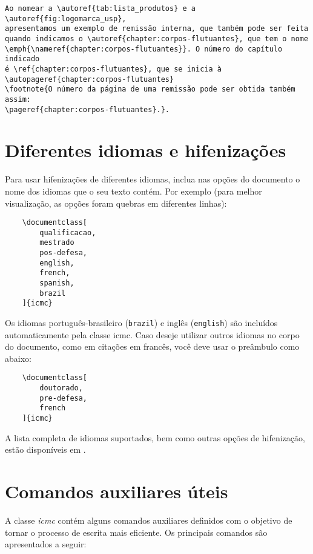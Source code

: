 \begin{verbatim}
Ao nomear a \autoref{tab:lista_produtos} e a \autoref{fig:logomarca_usp}, 
apresentamos um exemplo de remissão interna, que também pode ser feita 
quando indicamos o \autoref{chapter:corpos-flutuantes}, que tem o nome 
\emph{\nameref{chapter:corpos-flutuantes}}. O número do capítulo indicado 
é \ref{chapter:corpos-flutuantes}, que se inicia à 
\autopageref{chapter:corpos-flutuantes}
\footnote{O número da página de uma remissão pode ser obtida também assim: 
\pageref{chapter:corpos-flutuantes}.}.
\end{verbatim}

\section{Diferentes idiomas e hifenizações}
\label{sec-hifenizacao}

Para usar hifenizações de diferentes idiomas, inclua nas opções do documento o nome dos idiomas que o seu texto contém. Por exemplo (para melhor visualização, as opções foram quebras em diferentes linhas):

\begin{verbatim}
    \documentclass[
        qualificacao,
        mestrado
        pos-defesa,
        english,
        french,
        spanish,
        brazil
    ]{icmc}
\end{verbatim}

Os idiomas português-brasileiro (\texttt{brazil}) e inglês (\texttt{english}) são incluídos automaticamente pela classe \textsf{icmc}. Caso deseje utilizar outros idiomas no corpo do documento, como em citações em francês, você deve usar o preâmbulo como abaixo:

\begin{verbatim}
    \documentclass[
        doutorado,
        pre-defesa,
        french
    ]{icmc}
\end{verbatim}

A lista completa de idiomas suportados, bem como outras opções de hifenização, estão disponíveis em .


\section{Comandos auxiliares úteis}

A classe \textit{icmc} contém alguns comandos auxiliares definidos com o objetivo de tornar o processo de escrita mais eficiente. Os principais comandos são apresentados a seguir:

